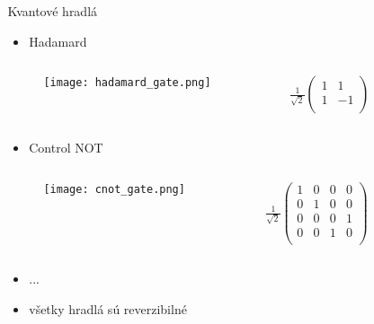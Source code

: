 \documentclass{beamer}
\begin{document}
\begin{frame}
\begin{columns}[t]
\begin{column}{.5\textwidth}
		\end{column}
				
		\begin{column}{.5\textwidth}
			\centering
			Kvantové hradlá
			\vspace{0.4cm}
			\begin{itemize}
				\item Hadamard
			\end{itemize}
								
			\begin{columns}[c]
				\begin{column}{.5\textwidth}
					\begin{figure}
						\centering
						\texttt{[image: hadamard\_gate.png]}
					\end{figure}
				\end{column}
								
				\begin{column}{.5\textwidth}
					\centering
					$\frac{1}{\sqrt{2}}\begin{pmatrix}
					1 & 1\\
					1 & -1\\
					\end{pmatrix}$
				\end{column}
			\end{columns}  
			\begin{itemize}
				\item Control NOT
			\end{itemize}
							
			\begin{columns}[c]
												
				\begin{column}{.5\textwidth}
					\begin{figure}
						\texttt{[image: cnot\_gate.png]}
					\end{figure}
				\end{column}
				\begin{column}{.5\textwidth}
					$\frac{1}{\sqrt{2}}\begin{pmatrix}
					1 & 0 & 0 & 0\\
					0 & 1 & 0 & 0\\
					0 & 0 & 0 & 1\\
					0 & 0 & 1 & 0\\
					\end{pmatrix}$
				\end{column}
									
			\end{columns}
			\begin{itemize}
				\item ...
				\item všetky hradlá sú reverzibilné
				      				      
			\end{itemize}
		\end{column}
	\end{columns}      
\end{frame}
\end{document}
